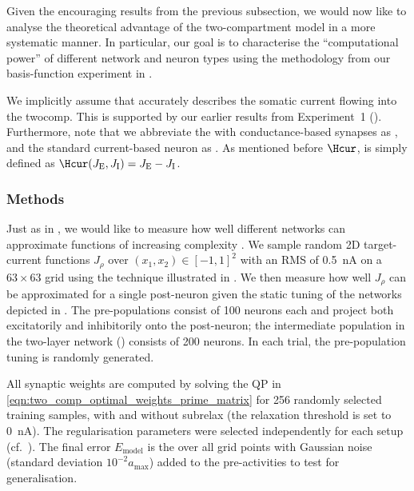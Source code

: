 Given the encouraging results from the previous subsection, we would now like to analyse the theoretical advantage of the two-compartment \LIF model in a more systematic manner.
In particular, our goal is to characterise the \enquote{computational power} of different network and neuron types using the methodology from our basis-function experiment in .

We implicitly assume that \Hcond accurately describes the somatic current flowing into the \gls{twocomp}.
This is supported by our earlier results from Experiment~1 ().
Furthermore, note that we abbreviate the  with conductance-based synapses as \Hcond, and the standard current-based \LIF neuron as \Hcur.
As mentioned before $\Hcur$, is simply defined as $\Hcur(J_\mathrm{E}, J_\mathrm{I}) = J_\mathrm{E} - J_\mathrm{I}$.

\subsubsection{Methods}
Just as in , we would like to measure how well different networks can approximate functions of increasing complexity \slc.
We sample random 2D target-current functions $J_\rho$ over $(x_1, x_2) \in [-1, 1]^2$ with an RMS of \SI{0.5}{\nano\ampere} on a $63 \times 63$ grid using the technique illustrated in .
We then measure how well $J_\rho$ can be approximated for a single post-neuron given the static tuning of the networks depicted in .
The pre-populations consist of \num{100} neurons each and project both excitatorily and inhibitorily onto the post-neuron; the intermediate population in the two-layer network () consists of \num{200} neurons.
In each trial, the pre-population tuning is randomly generated.

All synaptic weights are computed by solving the QP in \cref{eqn:two_comp_optimal_weights_prime_matrix} for 256 randomly selected training samples, with and without \gls{subrelax} (the relaxation threshold is set to \SI{0}{\nano\ampere}).
The regularisation parameters were selected independently for each setup (cf.~).
The final error $E_\mathrm{model}$ is the \NRMSE over all grid points with Gaussian noise (standard deviation $10^{-2} a_\mathrm{max}$) added to the pre-activities to test for generalisation.

